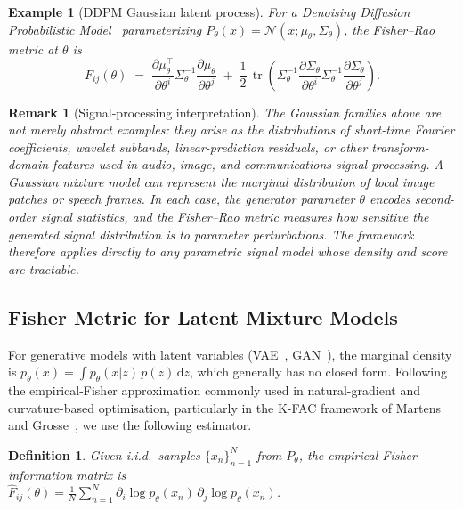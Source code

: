 \documentclass[a4paper,fleqn]{cas-dc}
\newtheorem{definition}{Definition}
\newtheorem{remark}{Remark}
\newtheorem{example}{Example}
\DeclareMathOperator{\tr}{tr}
\begin{document}
\begin{example}[DDPM Gaussian latent process]
  \label{ex:ddpm}
  For a Denoising Diffusion Probabilistic Model~\cite{ho2020denoising}
  parameterizing $P_\theta(x) = \mathcal{N}(x;\mu_\theta,\Sigma_\theta)$,
  the Fisher--Rao metric at $\theta$ is
  \begin{equation}
    F_{ij}(\theta) \;=\;
    \frac{\partial\mu_\theta^\top}{\partial\theta^i}
    \Sigma_\theta^{-1}
    \frac{\partial\mu_\theta}{\partial\theta^j}
    \;+\;
    \frac{1}{2}\,\tr\!\left(
      \Sigma_\theta^{-1}
      \frac{\partial\Sigma_\theta}{\partial\theta^i}
      \Sigma_\theta^{-1}
      \frac{\partial\Sigma_\theta}{\partial\theta^j}
    \right).
    \label{eq:fisher_ddpm}
  \end{equation}
\end{example}

\begin{remark}[Signal-processing interpretation]
  The Gaussian families above are not merely abstract examples: they arise as
  the distributions of short-time Fourier coefficients, wavelet subbands,
  linear-prediction residuals, or other transform-domain features used in
  audio, image, and communications signal processing.  A Gaussian mixture
  model can represent the marginal distribution of local image patches or
  speech frames.  In each case, the generator parameter $\theta$ encodes
  second-order signal statistics, and the Fisher--Rao metric measures how
  sensitive the generated signal distribution is to parameter perturbations.
  The framework therefore applies directly to any parametric signal model
  whose density and score are tractable.
\end{remark}

\subsection{Fisher Metric for Latent Mixture Models}
\label{subsec:mixture}

For generative models with latent variables (VAE~\cite{kingma2014vae},
GAN~\cite{goodfellow2014generative}), the marginal density is
$p_\theta(x) = \int p_\theta(x|z)\,p(z)\,\mathrm{d}z$,
which generally has no closed form.
Following the empirical-Fisher approximation commonly used in natural-gradient
and curvature-based optimisation, particularly in the K-FAC framework of
Martens and Grosse~\cite{martens2015optimizing}, we use the following estimator.

\begin{definition}%
  \label{def:empirical_fisher}
  Given i.i.d.\ samples $\{x_n\}_{n=1}^N$ from $P_\theta$, the
  \emph{empirical Fisher information matrix} is\\
  $\widehat{F}_{ij}(\theta) = \frac{1}{N}\sum_{n=1}^N
    \partial_i\log p_\theta(x_n)\, \partial_j\log p_\theta(x_n)$.
\end{definition}
\end{document}
